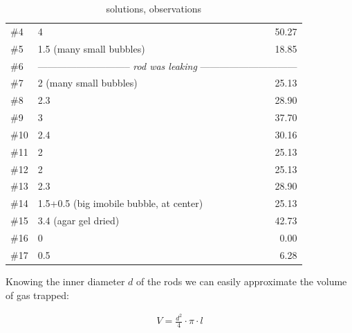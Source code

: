 \documentclass[parskip,bibtotoc,final,twoside=false,titlepage,a4paper,english,12pt,titlepage,a4paper]{scrbook}
\begin{document}
\begin{table}[]
\begin{tabular}{l|lr}
\#4   & 4					& 50.27				\\
\#5   & 1.5 (many small bubbles)		& 18.85				\\
\#6   & \multicolumn{2}{c}{-----------------------------\textit{ rod was leaking }------------------------------}\\
\#7   & 2 (many small bubbles)			& 25.13				\\
\#8   & 2.3					& 28.90				\\
\#9   & 3					& 37.70				\\
\#10  & 2.4					& 30.16				\\
\#11  & 2					& 25.13				\\
\#12  & 2					& 25.13				\\
\#13  & 2.3					& 28.90				\\
\#14  & 1.5+0.5 (big imobile bubble, at center)	& 25.13				\\
\#15  & 3.4 (agar gel dried)			& 42.73				\\
\#16  & 0					& 0.00				\\
\#17  & 0.5					& 6.28				\\
\bottomrule
\end{tabular}
\caption{solutions, observations}
\label{tab:bubbles}
\end{table}

Knowing the inner diameter $d$ of the rods we can easily approximate the volume of gas trapped:

\begin{align}
 V = \frac{d^2}{4}\cdot \pi \cdot l
\end{align}
\end{document}
